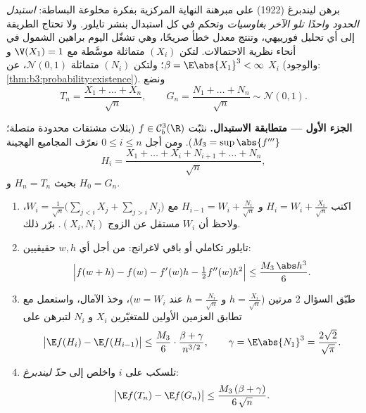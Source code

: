 \begin{problem}
\label{pb:b3:clt:1}
برهن ليندبرغ (1922) على مبرهنة النهاية المركزية بفكرة مخلوعة
البساطة: \emph{استبدل الحدود واحدًا تلو الآخر بغاوسيات} وتحكم
في كل استبدال بنشر تايلور. ولا تحتاج الطريقة إلى أي تحليل
فورييهي، وتنتج معدل خطأ صريحًا، وهي تشغّل اليوم براهين الشمول
في أنحاء نظرية الاحتمالات. لتكن $(X_i)$  متماثلة موسَّطة
مع $\V(X_1) = 1$ و $\beta = \E\abs{X_1}^3 < \infty$؛ ولتكن $(N_i)$  متماثلة
$\mathcal N(0,1)$،  عن $X_i$ (والوجود: \cref{thm:b3:probability:existence}). ونضع
\[
T_n = \frac{X_1 + \dots + X_n}{\sqrt n},
\qquad
G_n = \frac{N_1 + \dots + N_n}{\sqrt n} \sim \mathcal N(0,1).
\]

\medskip
\noindent\textbf{الجزء الأول --- متطابقة الاستبدال.} نثبّت
$f
\in \mathcal C^3_b(\R)$ (بثلاث مشتقات محدودة متصلة؛ $M_3 = \sup\abs{f'''}$). ومن أجل $0 \leq i \leq n$
نعرّف المجاميع الهجينة
\[
H_i = \frac{X_1 + \dots + X_i + N_{i+1} + \dots +
N_n}{\sqrt n},
\]
بحيث $H_n = T_n$ و $H_0 = G_n$.
\begin{enumerate}
  \item اكتب $H_i = W_i + \frac{X_i}{\sqrt n}$ و $H_{i-1}
        = W_i + \frac{N_i}{\sqrt n}$ مع $W_i =
        \frac{1}{\sqrt n}\bigl(\sum_{j<i}X_j +
        \sum_{j>i}N_j\bigr)$، ولاحظ أن $W_i$ مستقل
        عن الزوج $(X_i, N_i)$. برّر ذلك.
  \item تايلور  تكاملي أو باقي لاغرانج: من أجل أي
        $w, h$ حقيقيين:
        \[
        \Bigl|f(w + h) - f(w) - f'(w)h -
        \tfrac12f''(w)h^2\Bigr| \leq
        \frac{M_3\,\abs h^3}{6} .
        \]
  \item طبّق السؤال 2 مرتين ($h = \frac{X_i}{\sqrt n}$ و $h = \frac{N_i}{\sqrt n}$ عند $w = W_i$)،
        وخذ الآمال، واستعمل  مع تطابق العزمين
        الأولين للمتغيّرين $X_i$ و $N_i$ لتبرهن على
        \[
        \bigl|\E f(H_i) - \E f(H_{i-1})\bigr|
        \leq \frac{M_3}{6}\cdot
        \frac{\beta + \gamma}{n^{3/2}},
        \qquad \gamma = \E\abs{N_1}^3 =
        \frac{2\sqrt2}{\sqrt\pi} .
        \]
  \item تلسكب على $i$ واخلص إلى \emph{حدّ ليندبرغ}:
        \[
        \bigl|\E f(T_n) - \E f(G_n)\bigr| \leq
        \frac{M_3\,(\beta + \gamma)}{6\,\sqrt n} .
        \]
\end{enumerate}


\end{problem}
